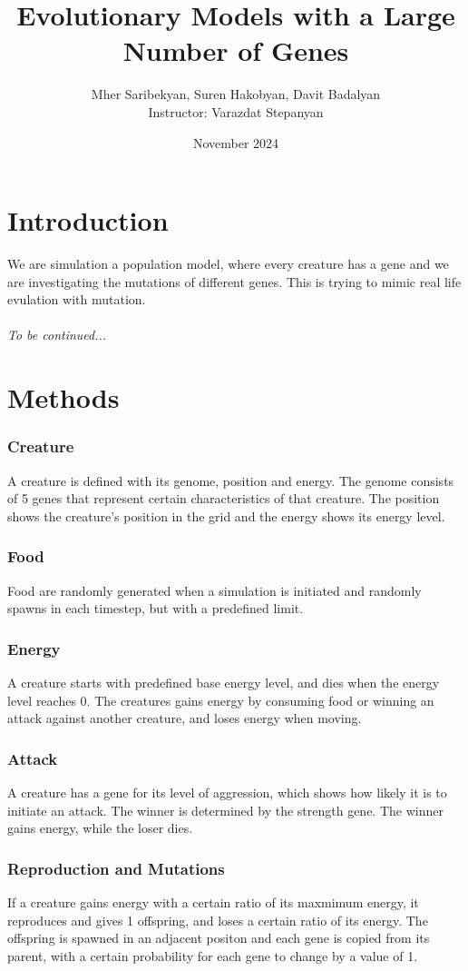 \documentclass{article}
\title{Evolutionary Models with a Large Number of Genes}
\author{
    Mher Saribekyan, Suren Hakobyan, Davit Badalyan\\
    Instructor: Varazdat Stepanyan 
}
\affil{American University of Armenia}
\date{November 2024}
\begin{document}
\maketitle
\section{Introduction}
We are simulation a population model, where every creature has a gene and we are investigating the mutations of different genes.
This is trying to mimic real life evulation with mutation.\\\\
\textit{To be continued...}
\section{Methods}
\subsubsection{Creature}
A creature is defined with its genome, position and energy.
The genome consists of 5 genes that represent certain characteristics of that creature.
The position shows the creature's position in the grid and the energy shows its energy level.
\subsubsection{Food}
Food are randomly generated when a simulation is initiated and randomly spawns in each timestep, but with a predefined limit.
\subsubsection{Energy}
A creature starts with predefined base energy level, and dies when the energy level reaches 0.
The creatures gains energy by consuming food or winning an attack against another creature, and loses energy when moving.
\subsubsection{Attack}
A creature has a gene for its level of aggression, which shows how likely it is to initiate an attack.
The winner is determined by the strength gene. The winner gains energy, while the loser dies.
\subsubsection{Reproduction and Mutations}
If a creature gains energy with a certain ratio of its maxmimum energy, it reproduces and gives 1 offspring, and loses a certain ratio of its energy.
The offspring is spawned in an adjacent positon and each gene is copied from its parent, with a certain probability for each gene to change by a value of 1.
\end{document}
